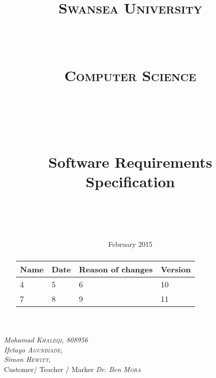 \documentclass[a4paper,10pt]{article}
\title{	
\normalfont \normalsize 
\begin{LARGE} \textsc{Swansea University} \end{LARGE} \\ [15pt] %
\begin{large} \textsc{Computer Science} \end{large} \\ [15pt] %
\vspace{50px}
\horrule{0.5pt} \\[0.4cm] %
\begin{Huge}Software Requirements Specification \end{Huge}%
\horrule{2pt} \\[0.5cm] %
}
\author{} %
\date{} %
\begin{document}
\begin{titlepage}
\maketitle
\vspace{50px}
\begin{flushleft}
  \textit{Mohamad \textsc{Khaleqi}, 808956} \\
  \textit{Ifetayo \textsc{Agunbiade}, } \\
 \textit{Simon \textsc{Hewitt}, } \\
  \hfill Customer/ Teacher / Marker \textit{Dr. Ben \textsc{Mora}}
\end{flushleft}

\vfill
\center \date{\normalsize February 2015} %

\end{titlepage}
\pagebreak
{} %
\tableofcontents{} 
\pagebreak
\justify

\renewcommand{\abstractname}{Revision History}
\begin{abstract}
\begin{center}
  \begin{tabular}{ |  p{3cm} | p{3cm} |  p{5cm} | p{2cm} |}
    \hline
    Name & Date & Reason of changes & Version \\ \hline \hline
    4 & 5 & 6 & 10 \\ \hline 
    7 & 8 & 9 & 11 \\
    \hline
  \end{tabular}
\end{center}
\end{abstract}



\end{document}
